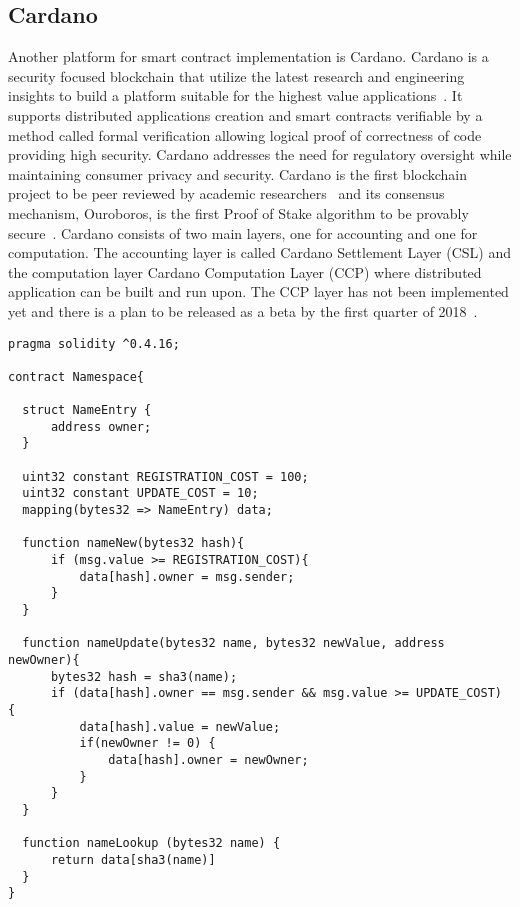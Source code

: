 \subsection{Cardano}\label{blockchain:impl:cardano}

Another platform for smart contract implementation is Cardano. Cardano is a security focused blockchain that utilize the latest research and engineering insights to build a platform suitable for the highest value applications~\cite{cardano_site}. It supports distributed applications creation and smart contracts verifiable by a method called formal verification allowing logical proof of correctness of code providing high security. Cardano addresses the need for regulatory oversight while maintaining consumer privacy and security. Cardano is the first blockchain project to be peer reviewed by academic researchers~\cite{cardano_site} and its consensus mechanism, Ouroboros, is the first Proof of Stake algorithm to be provably secure~\cite{Kiayias2017}. Cardano consists of two main layers, one for accounting and one for computation. The accounting layer is called Cardano Settlement Layer (CSL)
and the computation layer Cardano Computation Layer (CCP) where distributed application can be built and run upon. The CCP layer has not been implemented yet and there is a plan to be released as a beta by the first quarter of 2018~\cite{cardano_parsons}.

\clearpage

\begin{lstlisting}[language=Solidity, caption={An Ethereum Smart Contract}]
pragma solidity ^0.4.16;

contract Namespace{

  struct NameEntry {
      address owner;
  }

  uint32 constant REGISTRATION_COST = 100;
  uint32 constant UPDATE_COST = 10;
  mapping(bytes32 => NameEntry) data;

  function nameNew(bytes32 hash){
      if (msg.value >= REGISTRATION_COST){
          data[hash].owner = msg.sender;
      }
  }

  function nameUpdate(bytes32 name, bytes32 newValue, address newOwner){
      bytes32 hash = sha3(name);
      if (data[hash].owner == msg.sender && msg.value >= UPDATE_COST) {
          data[hash].value = newValue;
          if(newOwner != 0) {
              data[hash].owner = newOwner;
          }
      }
  }

  function nameLookup (bytes32 name) {
      return data[sha3(name)]
  }
}
\end{lstlisting}

\clearpage
